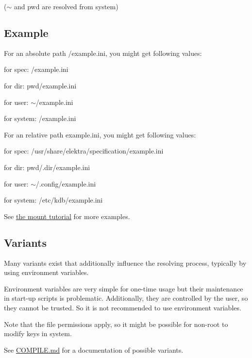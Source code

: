 ($\sim$ and {\ttfamily pwd} are resolved from system)

\subsection*{Example}

For an absolute path /example.ini, you might get following values\+:


\begin{DoxyItemize}
\item for spec\+: /example.ini
\item for dir\+: {\ttfamily pwd}/example.ini
\item for user\+: $\sim$/example.ini
\item for system\+: /example.ini
\end{DoxyItemize}

For an relative path example.\+ini, you might get following values\+:


\begin{DoxyItemize}
\item for spec\+: /usr/share/elektra/specification/example.ini
\item for dir\+: {\ttfamily pwd}/.dir/example.\+ini
\item for user\+: $\sim$/.config/example.\+ini
\item for system\+: /etc/kdb/example.ini
\end{DoxyItemize}

See \hyperlink{doc_tutorials_mount_md}{the mount tutorial} for more examples.

\subsection*{Variants}

Many variants exist that additionally influence the resolving process, typically by using environment variables.

Environment variables are very simple for one-\/time usage but their maintenance in start-\/up scripts is problematic. Additionally, they are controlled by the user, so they cannot be trusted. So it is not recommended to use environment variables.

Note that the file permissions apply, so it might be possible for non-\/root to modify keys in {\ttfamily system}.

See \hyperlink{doc_COMPILE_md}{C\+O\+M\+P\+I\+LE.md} for a documentation of possible variants.

